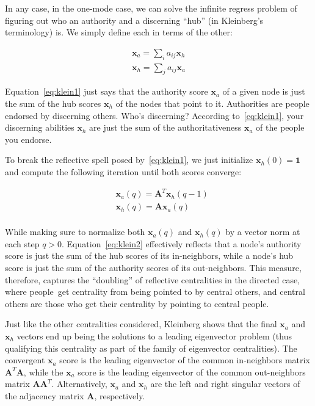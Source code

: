 \documentclass[a4paper,fleqn]{cas-sc}
\begin{document}
In any case, in the one-mode case, we can solve the infinite regress problem of figuring out who an authority and a discerning ``hub'' (in Kleinberg's terminology) is. We simply define each in terms of the other:

\begin{equation}
    \begin{split}
    \mathbf{x}_a = \sum_i  a_{ij} \mathbf{x}_h \\
    \mathbf{x}_h = \sum_j a_{ij} \mathbf{x}_a 
    \end{split}
    \label{eq:klein1}
\end{equation}

Equation~\ref{eq:klein1} just says that the authority score $\mathbf{x}_a$ of a given node is just the sum of the hub scores $\mathbf{x}_h$ of the nodes that point to it. Authorities are people endorsed by discerning others. Who's discerning? According to~\ref{eq:klein1}, your discerning abilities $\mathbf{x}_h$ are just the sum of the authoritativeness $\mathbf{x}_a$ of the people you endorse.

To break the reflective spell posed by~\ref{eq:klein1}, we just initialize $\mathbf{x}_h(0) = \mathbf{1}$ and compute the following iteration until both scores converge:

\begin{equation}
    \begin{split}
        &\mathbf{x}_a(q) = \mathbf{A}^T\mathbf{x}_h(q-1) \\
        &\mathbf{x}_h(q) = \mathbf{A}\mathbf{x}_a(q) \\
    \end{split}
    \label{eq:klein2}
\end{equation}

While making sure to normalize both $\mathbf{x}_a(q)$ and $\mathbf{x}_h(q)$ by a vector norm at each step $q > 0$. Equation~\ref{eq:klein2} effectively reflects that a node's authority score is just the sum of the hub scores of its in-neighbors, while a node's hub score is just the sum of the authority scores of its out-neighbors. This measure, therefore, captures the ``doubling'' of reflective centralities in the directed case, where people\ get centrality from being pointed to by central others, and central others are those who get their centrality by pointing to central people. 

Just like the other centralities considered, Kleinberg shows that the final $\mathbf{x}_a$ and $\mathbf{x}_h$ vectors end up being the solutions to a leading eigenvector problem (thus qualifying this centrality as part of the family of eigenvector centralities). The convergent $\mathbf{x}_a$ score is the leading eigenvector of the common in-neighbors matrix $\mathbf{A}^T\mathbf{A}$, while the $\mathbf{x}_a$ score is the leading eigenvector of the common out-neighbors matrix $\mathbf{A}\mathbf{A}^T$. Alternatively, $\mathbf{x}_a$ and $\mathbf{x}_h$ are the left and right singular vectors of the adjacency matrix $\mathbf{A}$, respectively.
\end{document}
